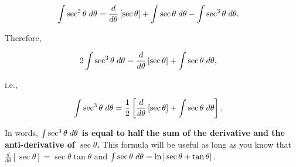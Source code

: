 \documentclass[12pt]{article}
\begin{document}
\begin{align*}
    \int\sec^3\theta \hspace{1mm} d\theta  &= \frac{d}{d\theta}\left[\sec\theta\right] + \int\sec\theta \hspace{1mm} d\theta  - \int\sec^3\theta \hspace{1mm} d\theta.
\end{align*}

\noindent Therefore,

\begin{align*}
    2\int\sec^3\theta \hspace{1mm} d\theta  &= \frac{d}{d\theta}\left[\sec\theta\right] + \int\sec\theta \hspace{1mm} d\theta,
\end{align*}

\noindent i.e., 

\begin{align*}
    \int\sec^3\theta \hspace{1mm} d\theta  &= \frac{1}{2}\left[ \frac{d}{d\theta}\left[\sec\theta\right] + \int\sec\theta \hspace{1mm} d\theta \right].
\end{align*}

\noindent In words, \textbf{$\int\sec^3\theta \hspace{1mm} d\theta$ is equal to half the sum of the derivative and the anti-derivative of $\sec\theta$.} This formula will be useful as long as you know that $\frac{d}{d\theta}[\sec\theta] = \sec\theta\tan\theta$ and $\int\sec\theta \hspace{1mm} d\theta = \ln|\sec\theta + \tan\theta|$.
\end{document}
